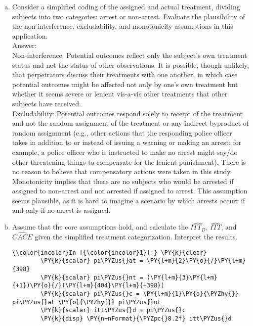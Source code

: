 \documentclass[11pt,notitlepage]{article}\usepackage[]{graphicx}\usepackage[]{color}
\makeatletter
\newenvironment{kframe}{%
 \def\at@end@of@kframe{}%
 \ifinner\ifhmode%
  \def\at@end@of@kframe{\end{minipage}}%
  \begin{minipage}{\columnwidth}%
 \fi\fi%
 \def\FrameCommand##1{\hskip\@totalleftmargin \hskip-\fboxsep
 \colorbox{shadecolor}{##1}\hskip-\fboxsep
     \hskip-\linewidth \hskip-\@totalleftmargin \hskip\columnwidth}%
 \MakeFramed {\advance\hsize-\width
   \@totalleftmargin\z@ \linewidth\hsize
   \@setminipage}}%
 {\par\unskip\endMakeFramed%
 \at@end@of@kframe}
\newenvironment{knitrout}{}{} %
\makeatother
\begin{document}
\begin{enumerate}[a)]
\item Consider a simplified coding of the assigned and actual treatment, dividing subjects into two categories: arrest or non-arrest. Evaluate the plausibility of the non-interference, excludability, and monotonicity assumptions in this application.\\
Answer:\\
Non-interference: Potential outcomes reflect only the subject's own treatment status and not the status of other observations. It is possible, though unlikely, that perpetrators discuss their treatments with one another, in which case potential outcomes might be affected not only by one's own treatment but whether it seems severe or lenient vis-a-vis other treatments that other subjects have received.\\
Excludability: Potential outcomes respond solely to receipt of the treatment and not the random assignment of the treatment or any indirect byproduct of random assignment (e.g., other actions that the responding police officer takes in addition to or instead of issuing a warning or making an arrest; for example, a police officer who is instructed to make no arrest might say/do other threatening things to compensate for the lenient punishment). There is no reason to believe that compensatory actions were taken in this study. \\
Monotonicity implies that there are no subjects who would be arrested if assigned to non-arrest and not arrested if assigned to arrest. This assumption seems plausible, as it is hard to imagine a scenario by which arrests occurr if and only if no arrest is assigned. 

\item Assume that the core assumptions hold, and calculate the $\widehat{ITT_D}$, $\widehat{ITT}$, and $\widehat{CACE}$ given the simplified treatment categorization. Interpret the results.\\
\begin{knitrout}
\color{fgcolor}\begin{kframe}
   \begin{Verbatim}[commandchars=\\\{\}]
{\color{incolor}In [{\color{incolor}1}]:} \PY{k}{clear}
        \PY{k}{scalar} pi\PYZus{}at = \PY{l+m}{2}\PY{o}{/}\PY{l+m}{398}
        \PY{k}{scalar} pi\PYZus{}nt = (\PY{l+m}{3}\PY{l+m}{+1})\PY{o}{/}(\PY{l+m}{404}\PY{l+m}{+398})
        \PY{k}{scalar} pi\PYZus{}c = \PY{l+m}{1}\PY{o}{\PYZhy{}} pi\PYZus{}at \PY{o}{\PYZhy{}} pi\PYZus{}nt
        \PY{k}{scalar} itt\PYZus{}d = pi\PYZus{}c
        \PY{k}{disp} \PY{n+nFormat}{\PYZpc{}8.2f} itt\PYZus{}d
\end{Verbatim}


\end{kframe}
\end{knitrout}
\end{enumerate}
\end{document}
